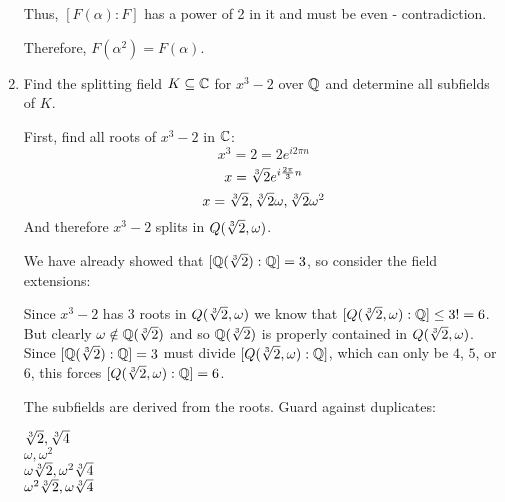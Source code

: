 \documentclass[letterpaper,12pt,fleqn]{article}
\renewcommand{\a}{\alpha}
\newcommand{\w}{\omega}
\begin{document}
\begin{enumerate}
  Thus, $[F(\a):F]$ has a power of 2 in it and must be even - contradiction.

  Therefore, $F(\a^2)=F(\a)$.

  \bigskip

  \newcommand{\fw}{Q(\ct,\w)}
  
\item Find the splitting field $K\subseteq\mathbb{C}$ for $x^3-2$ over $\mathbb{Q}$ and
  determine all subfields of $K$.
  
  First, find all roots of $x^3-2$ in $\mathbb{C}$:
  \[x^3=2=2e^{i2\pi n}\]
  \[x=\sqrt[3]{2} e^{i\frac{2\pi}{3}n}\]
  \[x=\ct,\ct\w,\ct\w^2\]
  And therefore $x^3-2$ splits in $\fw$.

  We have already showed that $[\mathbb{Q}(\sqrt[3]{2}):\mathbb{Q}]=3$, so consider the field extensions:


  Since $x^3-2$ has 3 roots in $\fw$ we know that $[\fw:\Q]\le3!=6$. But clearly
  $\w\notin\fl$ and so $\mathbb{Q}(\sqrt[3]{2})$ is properly contained in $\fw$. Since $[\mathbb{Q}(\sqrt[3]{2}):\mathbb{Q}]=3$ must
  divide $[\fw:\Q]$, which can only be $4$, $5$, or $6$, this forces $[\fw:\Q]=6$.

  The subfields are derived from the roots. Guard against duplicates:

  $\sqrt[3]{2},\sqrt[3]{4}$ \\
  $\w,\w^2$ \\
  $\w\ct,\w^2\cf$ \\
  $\w^2\ct,\w\cf$ \\
  

\end{enumerate}
\end{document}
